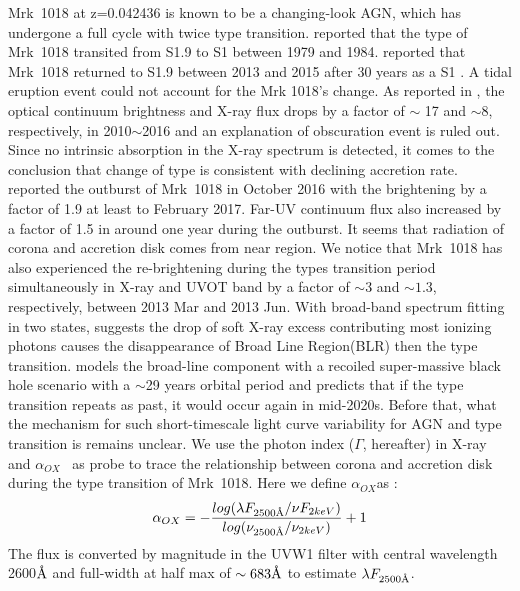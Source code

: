 \documentclass{aastex63}
\newcommand{\alphaox}{$\alpha_{OX}$}
\newcommand{\angstrom}{\text{\normalfont\AA}}
\begin{document}
Mrk~1018 at z=0.042436 is known to be a changing-look AGN, which has undergone a full cycle with twice type transition. \citet{1986ApJ...311..135C} reported that the type of Mrk~1018 transited from S1.9 to S1 between 1979 and 1984. \citet{2016A&A...593L...8M} reported that Mrk~1018 returned to S1.9 between 2013 and 2015 after 30 years as a S1 \citep[see also][]{2017A&A...607L...9K}. A tidal eruption event could not account for the Mrk 1018's change. As reported in \citet{2016A&A...593L...9H}, the optical continuum brightness and X-ray flux drops by a factor of $\sim$ 17 and $\sim 8$, respectively, in 2010$\sim$2016 and an explanation of obscuration event is ruled out. Since no intrinsic absorption in the X-ray spectrum is detected, it comes  to the conclusion that change of type is consistent with declining accretion rate. \citet{2017A&A...607L...9K} reported the outburst of Mrk~1018 in October 2016 with the brightening by a factor of 1.9 at least to February 2017. Far-UV continuum flux also increased by a factor of 1.5 in around one year during the outburst. It seems that radiation of corona and accretion disk comes from near region. We notice that Mrk~1018 has also experienced the re-brightening during the types transition period simultaneously in X-ray and UVOT band by a factor of $\sim3$ and $\sim1.3$, respectively, between 2013 Mar and 2013 Jun. With broad-band spectrum fitting in two states, \citet{2018MNRAS.480.3898N} suggests the drop of soft X-ray excess contributing most ionizing photons causes the disappearance of Broad Line Region(BLR) then the type transition. \citet{2018ApJ...861...51K} models the broad-line component with a recoiled super-massive black hole scenario with a $\sim$29 years orbital period and predicts that if the type transition repeats as past, it would occur again in mid-2020s. Before that, what the mechanism for such short-timescale light curve variability for AGN and type transition is remains unclear. We use the photon index ($\Gamma$, hereafter) in X-ray and \alphaox ~ as probe to trace the relationship between corona and accretion disk during the type transition of Mrk~1018. Here we define \alphaox as :
\begin{equation}
\alpha_{OX}  = - \frac{log(\lambda F_{2500 \angstrom}/\nu F_{2keV})}{log(\nu_{ 2500 \angstrom }/\nu_{2keV})}+1
\end{equation}
The flux is converted by magnitude in the UVW1 filter with central wavelength {2600{$\angstrom$}} and full-width at half max of $\sim 683\angstrom$ \citep{2008MNRAS.383..627P} to estimate $\lambda F_{2500 \angstrom}$.  
\end{document}

